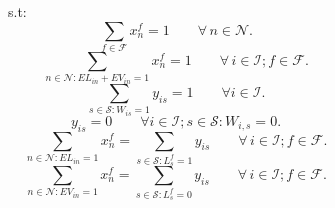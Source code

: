 \documentclass[authoryear,preprint,review,12pts]{elsarticle}
\begin{document}
~~~~~~~~~~~~s.t:
\begin{equation}\label{ecua1}
    \sum_{f \in \mathcal{F}} x_n^f = 1 \qquad \forall \,n \in \mathcal{N}.
\end{equation}
\begin{equation}\label{ecua2}
    \sum_{n \in \mathcal{N}: EL_{in} + EV_{in}=1} x_n^f = 1 \qquad \forall \,i \in \mathcal{I}; f \in \mathcal{F}.
\end{equation}
\begin{equation}\label{ecua3}
  \sum_{s \in \mathcal{S}: W_{is}=1} y_{is} = 1 \qquad \forall i \in \mathcal{I}.
\end{equation}
\begin{equation}\label{ecua4}
  y_{is} = 0 \qquad \forall i \in \mathcal{I}; s \in \mathcal{S}: W_{i,s} = 0.
\end{equation}
\begin{equation}\label{ecua5}
  \sum_{n \in \mathcal{N}: EL_{in}=1} x_n^f = \sum_{s \in \mathcal{S}: L_s^f = 1} y_{is} \qquad \forall \,i \in \mathcal{I}; f \in \mathcal{F}.
\end{equation}
\begin{equation}\label{ecua6}
  \sum_{n \in \mathcal{N}: EV_{in}=1} x_n^f = \sum_{s \in \mathcal{S}: L_s^f = 0} y_{is} \qquad \forall \,i \in \mathcal{I}; f \in \mathcal{F}.
\end{equation}
\end{document}
